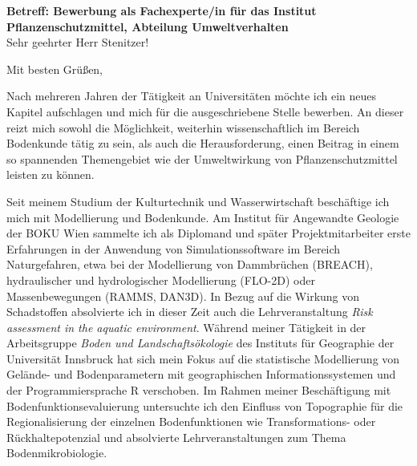 \documentclass[11pt,a4paper,sans]{moderncv}        %
\begin{document}
\renewcommand*{\bibliographyhead}[1]{}

\date{26. Februar 2018}
\opening{\textbf{Betreff: Bewerbung als Fachexperte/in f\"ur das Institut Pflanzenschutzmittel, Abteilung
Umweltverhalten} \\[0.5cm]     Sehr geehrter Herr Stenitzer!}
\closing{Mit besten Gr\"{u}{\ss}en,}

\makelettertitle
\justify
\vspace{-0.5cm} %

Nach mehreren Jahren der T\"atigkeit an Universit\"aten m\"ochte ich ein neues Kapitel aufschlagen und mich f\"ur die ausgeschriebene Stelle bewerben. An dieser reizt mich sowohl die M\"oglichkeit, weiterhin wissenschaftlich im Bereich Bodenkunde t\"atig zu sein, als auch die Herausforderung, einen Beitrag in einem so spannenden Themengebiet wie der Umweltwirkung von Pflanzenschutzmittel leisten zu k\"onnen.

Seit meinem Studium der Kulturtechnik und Wasserwirtschaft besch\"aftige ich mich mit Modellierung und Bodenkunde. Am Institut f\"ur Angewandte Geologie der BOKU Wien sammelte ich als Diplomand und sp\"ater Projektmitarbeiter erste Erfahrungen in der Anwendung von Simulationssoftware im Bereich Naturgefahren, etwa bei der Modellierung von Dammbr\"uchen (BREACH), hydraulischer und hydrologischer Modellierung (FLO-2D) oder Massenbewegungen (RAMMS, DAN3D). In Bezug auf die Wirkung von Schadstoffen absolvierte ich in dieser Zeit auch die Lehrveranstaltung \emph{Risk assessment in the aquatic environment}. W\"ahrend meiner T\"atigkeit in der Arbeitsgruppe \emph{Boden und Landschafts\"okologie} des Instituts f\"ur Geographie der Universit\"at Innsbruck hat sich mein Fokus auf die statistische Modellierung von Gel\"ande- und Bodenparametern mit geographischen Informationssystemen und der Programmiersprache R verschoben. Im Rahmen meiner Besch\"aftigung mit Bodenfunktionsevaluierung untersuchte ich den Einfluss von Topographie f\"ur die Regionalisierung der  einzelnen Bodenfunktionen wie Transformations- oder R\"uckhaltepotenzial und absolvierte Lehrveranstaltungen zum Thema Bodenmikrobiologie.
\end{document}
